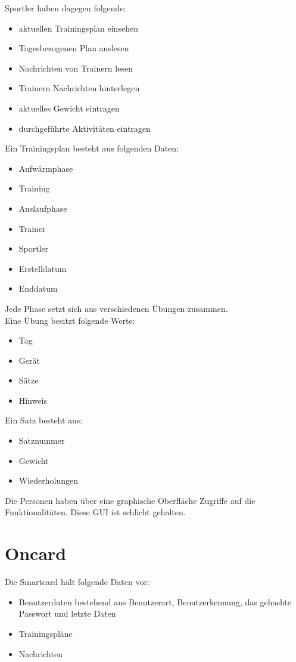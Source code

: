 \documentclass[a4paper,12pt]{article}
\begin{document}
Sportler haben dagegen folgende:
\begin{itemize}
\item aktuellen Trainingsplan einsehen
\item Tagesbezogenen Plan auslesen
\item Nachrichten von Trainern lesen
\item Trainern Nachrichten hinterlegen
\item aktuelles Gewicht eintragen
\item durchgeführte Aktivitäten eintragen
\end{itemize}

Ein Trainingsplan besteht aus folgenden Daten:
\begin{itemize}
\item Aufwärmphase
\item Training
\item Auslaufphase
\item Trainer
\item Sportler
\item Erstelldatum
\item Enddatum
\end{itemize}

Jede Phase setzt sich aus verschiedenen Übungen zusammen.\\
Eine Übung besitzt folgende Werte:
\begin{itemize}
\item Tag
\item Gerät
\item Sätze
\item Hinweis
\end{itemize}

Ein Satz besteht aus:
\begin{itemize}
\item Satznummer
\item Gewicht
\item Wiederholungen
\end{itemize}

Die Personen haben über eine graphische Oberfläche Zugriffe auf die Funktionalitäten. Diese GUI ist schlicht gehalten.



\section{Oncard}
Die Smartcard hält folgende Daten vor:
\begin{itemize}
\item Benutzerdaten bestehend aus Benutzerart, Benutzerkennung, das gehashte Passwort und letzte Daten
\item Trainingspläne
\item Nachrichten
\end{itemize}
\end{document}

